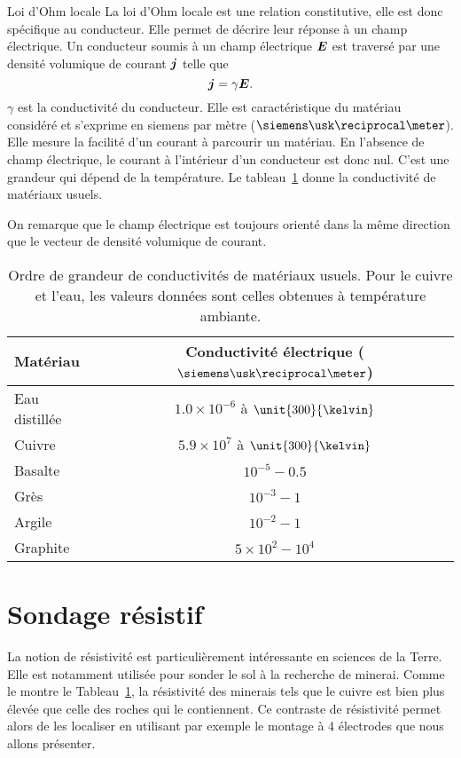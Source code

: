 \begin{defn}{Loi d'Ohm locale}
	La loi d'Ohm locale est une relation constitutive, elle est donc spécifique
	au conducteur. Elle permet de décrire leur réponse à un champ électrique.
	Un conducteur soumis à un champ électrique $\vece$ est traversé
	par une densité volumique de courant $\vecj$ telle que 
	\begin{equation}
		\vecj = \gamma \vece.
	\end{equation}
	$\gamma$ est la conductivité du conducteur. Elle est caractéristique du
	matériau considéré et s'exprime en siemens par mètre ($\siemens \usk 
	\reciprocal \meter$). Elle mesure la facilité d'un courant à parcourir 
	un matériau. En l'absence de champ électrique, le courant à l'intérieur
	d'un conducteur est donc nul. C'est une grandeur qui dépend de la température. 
	Le tableau~\ref{tab:conductivite} donne la conductivité de matériaux usuels.
\end{defn}

\begin{rema}
	On remarque que le champ électrique est toujours orienté dans la même
	direction que le vecteur de densité volumique de courant.
\end{rema}

\begin{table}
	\centering
	\caption{Ordre de grandeur de conductivités de matériaux usuels. Pour le
		 cuivre et l'eau, les valeurs données sont celles obtenues 
	 	 à température ambiante.}
	\begin{tabular}{l|c}
		\textbf{Matériau} & \textbf{Conductivité électrique} 
		($\siemens \usk \reciprocal \meter$)\\ \hline
		Eau distillée 	 & $1.0 \times 10^{-6}$ à $\unit{300}{\kelvin}$ \\[0.5em]
		Cuivre   & $5.9 \times 10^7$ à $\unit{300}{\kelvin}$\\[0.5em]
		Basalte   & $10^{-5} - 0.5$ \\[0.5em]
		Grès     & $10^{-3} - 1$\\[0.5em]
		Argile   & $10^{-2} - 1$\\[0.5em]
		Graphite & $5 \times 10^{2} - 10^4$\\ \hline
	\end{tabular}
	\label{tab:conductivite}
\end{table}

\section{Sondage résistif}
La notion de résistivité est particulièrement intéressante en sciences de la 
Terre. Elle est notamment utilisée pour sonder le sol à la recherche de minerai.
Comme le montre le Tableau~\ref{tab:conductivite}, la résistivité des minerais tels que
le cuivre est bien plus élevée que celle des roches qui le contiennent. Ce contraste
de résistivité permet alors de les localiser en utilisant par exemple le montage
à 4 électrodes que nous allons présenter.

